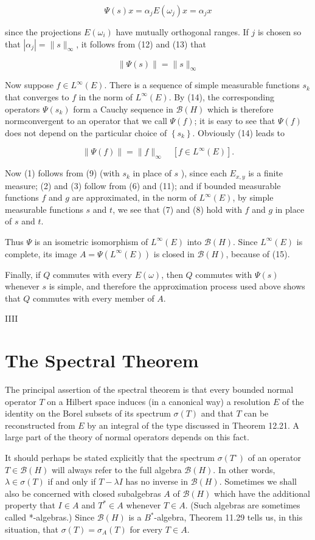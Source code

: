 \documentclass[10pt]{article}
\begin{document}
$$
\Psi(s) x=\alpha_{j} E\left(\omega_{j}\right) x=\alpha_{j} x
$$

since the projections $E\left(\omega_{i}\right)$ have mutually orthogonal ranges. If $j$ is chosen so that $\left|\alpha_{j}\right|=\|s\|_{\infty}$, it follows from (12) and (13) that

$$
\|\Psi(s)\|=\|s\|_{\infty}
$$

Now suppose $f \in L^{\infty}(E)$. There is a sequence of simple measurable functions $s_{k}$ that converges to $f$ in the norm of $L^{\infty}(E)$. By (14), the corresponding operators $\Psi\left(s_{k}\right)$ form a Cauchy sequence in $\mathscr{B}(H)$ which is therefore normconvergent to an operator that we call $\Psi(f)$; it is easy to see that $\Psi(f)$ does not depend on the particular choice of $\left\{s_{k}\right\}$. Obviously (14) leads to

$$
\|\Psi(f)\|=\|f\|_{\infty} \quad\left[f \in L^{\infty}(E)\right] .
$$

Now (1) follows from (9) (with $s_{k}$ in place of $s$ ), since each $E_{x, y}$ is a finite measure; (2) and (3) follow from (6) and (11); and if bounded measurable functions $f$ and $g$ are approximated, in the norm of $L^{\infty}(E)$, by simple measurable functions $s$ and $t$, we see that (7) and (8) hold with $f$ and $g$ in place of $s$ and $t$.

Thus $\Psi$ is an isometric isomorphism of $L^{\infty}(E)$ into $\mathscr{B}(H)$. Since $L^{\infty}(E)$ is complete, its image $A=\Psi\left(L^{\infty}(E)\right)$ is closed in $\mathscr{B}(H)$, because of (15).

Finally, if $Q$ commutes with every $E(\omega)$, then $Q$ commutes with $\Psi(s)$ whenever $s$ is simple, and therefore the approximation process used above shows that $Q$ commutes with every member of $A$.

IIII

\section{The Spectral Theorem}
The principal assertion of the spectral theorem is that every bounded normal operator $T$ on a Hilbert space induces (in a canonical way) a resolution $E$ of the identity on the Borel subsets of its spectrum $\sigma(T)$ and that $T$ can be reconstructed from $E$ by an integral of the type discussed in Theorem 12.21. A large part of the theory of normal operators depends on this fact.

It should perhaps be stated explicitly that the spectrum $\sigma\left(T^{\circ}\right)$ of an operator $T \in \mathscr{B}(H)$ will always refer to the full algebra $\mathscr{B}(H)$. In other words, $\lambda \in \sigma(T)$ if and only if $T-\lambda I$ has no inverse in $\mathscr{B}(H)$. Sometimes we shall also be concerned with closed subalgebras $A$ of $\mathscr{B}(H)$ which have the additional property that $I \in A$ and $T^{*} \in A$ whenever $T \in A$. (Such algebras are sometimes called *-algebras.) Since $\mathscr{B}(H)$ is a $B^{*}$-algebra, Theorem 11.29 tells us, in this situation, that $\sigma(T)=\sigma_{A}(T)$ for every $T \in A$.
\end{document}
